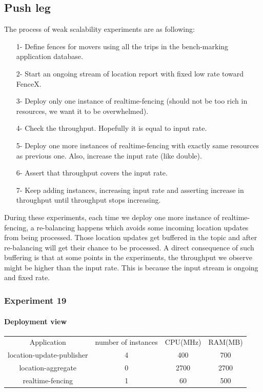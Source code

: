 \documentclass[a4]{report}
\begin{document}
    \subsection{Push leg}
    The process of weak scalability experiments are as following:
    \begin{itemize}
        \item[1-] Define fences for movers using all the trips in the bench-marking application database.
        \item[2-] Start an ongoing stream of location report with fixed low rate toward FenceX.
        \item[3-] Deploy only one instance of realtime-fencing (should not be too rich in resources, we want it to
        be overwhelmed).
        \item[4-] Check the throughput. Hopefully it is equal to input rate.
        \item[5-] Deploy one more instances of realtime-fencing with exactly same resources as previous one. Also,
        increase the input rate (like double).
        \item[6-] Assert that throughput covers the input rate.
        \item[7-] Keep adding instances, increasing input rate and asserting increase in throughput until throughput 
        stops increasing.
    \end{itemize}

    During these experiments, each time we deploy one more instance of realtime-fencing, a re-balancing happens which
    avoids some incoming location updates from being processed.
    Those location updates get buffered in the topic and after re-balancing will get their chance to be processed.
    A direct consequence of such buffering is that at some points in the experiments, the throughput we observe might be
    higher than the input rate.
    This is because the input stream is ongoing and fixed rate.

    \subsubsection{Experiment 19}
    \paragraph{Deployment view}
    \begin{center}
        \begin{tabular}{ c c c c }
            Application               &  number of instances     & CPU(MHz)  & RAM(MB)    \\
            location-update-publisher &          4               & 400       &   700      \\
            location-aggregate        &          0               & 2700      &   2700     \\
            realtime-fencing          &          1               & 60       &   500       \\
        \end{tabular}
    \end{center}
\end{document}
